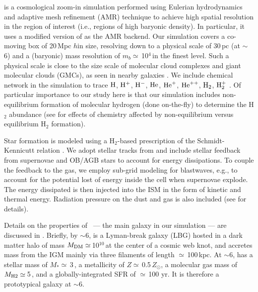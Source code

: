 \documentclass[iop]{emulateapj} %
\begin{document}
 is a cosmological zoom-in simulation performed using Eulerian hydrodynamics and
adaptive mesh refinement (AMR) technique to achieve high spatial resolution in the region of interest (i.e., regions of high baryonic density).
In particular, it uses a modified version of  \citep{Teyssier2002a} as the AMR backend.
Our simulation covers a co-moving box of 20\,Mpc $h$\pmOne in size, resolving down to a physical scale of 30\,pc (at \z$\sim$\,6) and a (baryonic) mass resolution of $m_b\simeq$\,10$^4$\,\Msun in the finest level. Such a physical scale is close to the size scale of molecular cloud complexes and giant molecular clouds (GMCs), as seen in nearby galaxies \citep[e.g.,][]{Sanders85a, Federrath13a, Goodman14a}.
We include chemical network in the simulation to trace $\rm{H}$, $\rm{H}^{+}$, $\rm{H}^{-}$, $\rm{He}$, $\rm{He}^{+}$, $\rm{He}^{++}$, $\rm{H}_2$, $\rm{H}_2^{+}$ \citep{Grassi14a,Bovino16a}.
Of particular importance to our study here is that our simulation includes non-equilibrium formation of molecular hydrogen (done on-the-fly) to determine the H$_2$ abundance (see \citealt{Pallottini17b} for effects of chemistry affected by non-equilibrium versus equilibrium H$_2$ formation).

Star formation is modeled using a H$_2$-based prescription of the Schmidt-Kennicutt relation \citep{Krumholz09a}. We adopt stellar tracks from  and include stellar feedback from supernovae and OB/AGB stars to account for energy dissipations. To couple the feedback to the gas, we employ sub-grid modeling for blastwaves, e.g., to account for the potential lost of energy inside the cell when supernovae explode. The energy dissipated is then injected into the ISM in the form of kinetic and thermal energy. Radiation pressure on the dust and gas is also included (see \citealt{Pallottini17a} for details).

Details on the properties of \flower\ --- the main galaxy in our simulation --- are discussed in \citet{Pallottini17b}.
Briefly, by \z$\sim$6, \flower is a Lyman-break galaxy (LBG) hosted in a dark matter halo of mass $M_{\rm DM}\simeq$\,10$^{10}$\,\Msun at the center of a cosmic web knot, and accretes mass from the IGM mainly via three filaments of length $\simeq$\,100\,kpc. At \z$\sim$6, \flower has a stellar mass of $M_*\simeq$\,3\,\Msun, a metallicity of $Z\simeq$\,0.5\,$Z_{\odot}$, a molecular gas mass of $M_{\rm H2}\simeq$\,5\,\Msun, and a globally-integrated SFR of $\simeq$\,100\,\Msun\,yr\pmOne. It is therefore a prototypical galaxy at \z$\sim$6.
\end{document}

